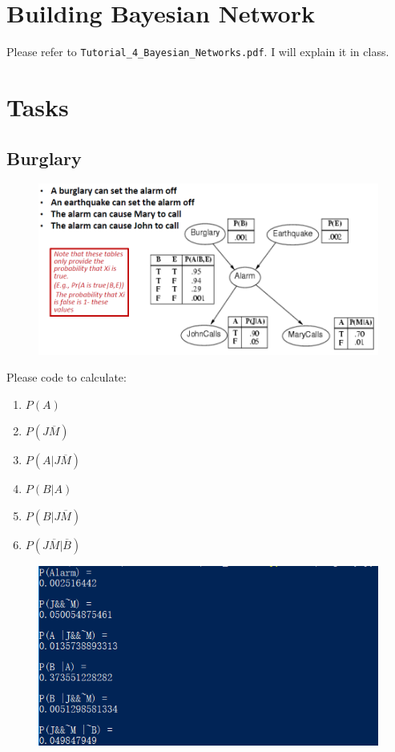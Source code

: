 \documentclass[a4paper, 11pt]{article}
\begin{document}
\section{Building Bayesian Network}
\label{sec:build-bayes-netw}
Please refer to \texttt{Tutorial\_4\_Bayesian\_Networks.pdf}. I will explain it in class.

\section{Tasks}
\label{sec:tasks}

\subsection{Burglary}
\label{sec:burglary}
\begin{figure}[h]
  \centering

  \includegraphics[width=14cm]{fig/burglary}
\end{figure}
Please code to calculate:
\begin{enumerate}
\item $P(A)$
\item $P(J\overline{M})$
\item $P(A | J\overline{M})$
\item $P(B | A)$
\item $P(B | J\overline{M})$
\item  $P(J\overline{M} | \overline{B})$
\end{enumerate}
\begin{figure}[ht]
\centering
\includegraphics[width=12cm]{fig/burglar_result}
\end{figure}
\end{document}
